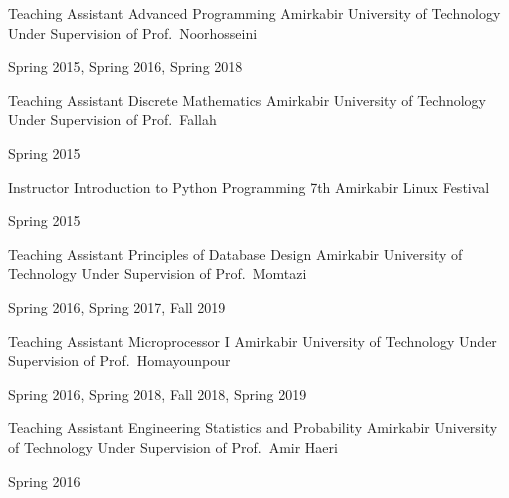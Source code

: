 \begin{cventries}
  \cventry%
    {Teaching Assistant} %
    {Advanced Programming} %
    {Amirkabir University of Technology} %
    {Under Supervision of Prof.\ Noorhosseini} %
    {%
      \begin{cvitems} %
        Spring 2015, Spring 2016, Spring 2018
      \end{cvitems}
    }

  \cventry%
    {Teaching Assistant} %
    {Discrete Mathematics} %
    {Amirkabir University of Technology} %
    {Under Supervision of Prof.\ Fallah} %
    {%
      \begin{cvitems} %
        Spring 2015
      \end{cvitems}
    }

  \cventry%
    {Instructor} %
    {Introduction to Python Programming} %
    {7th Amirkabir Linux Festival} %
    {} %
    {%
      \begin{cvitems} %
        Spring 2015
      \end{cvitems}
    }

  \cventry%
    {Teaching Assistant} %
    {Principles of Database Design} %
    {Amirkabir University of Technology} %
    {Under Supervision of Prof.\ Momtazi} %
    {%
      \begin{cvitems} %
        Spring 2016, Spring 2017, Fall 2019
      \end{cvitems}
    }

  \cventry%
    {Teaching Assistant} %
    {Microprocessor I} %
    {Amirkabir University of Technology} %
    {Under Supervision of Prof.\ Homayounpour} %
    {%
      \begin{cvitems} %
        Spring 2016, Spring 2018, Fall 2018, Spring 2019
      \end{cvitems}
    }

  \cventry%
    {Teaching Assistant} %
    {Engineering Statistics and Probability} %
    {Amirkabir University of Technology} %
    {Under Supervision of Prof.\ Amir Haeri} %
    {%
      \begin{cvitems} %
        Spring 2016
      \end{cvitems}
    }


\end{cventries}
